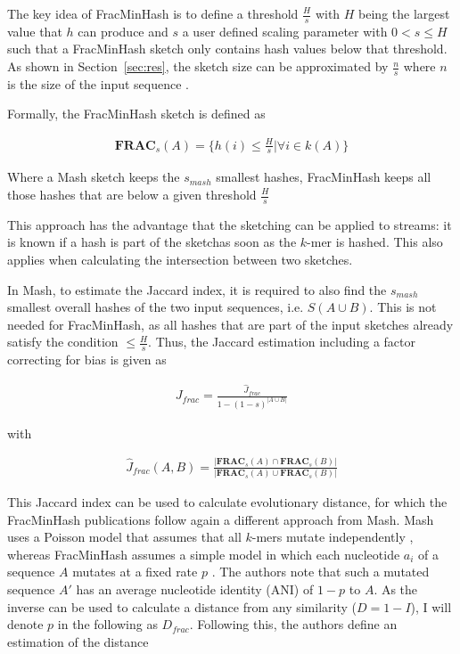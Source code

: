 The key idea of FracMinHash is to define a threshold $\frac{H}{s}$ with $H$
being the largest value that $h$ can produce and $s$ a user defined scaling
parameter with $0 < s \leq H$ such that a FracMinHash sketch only contains hash
values below that threshold. As shown in Section~\ref{sec:res}, the sketch size can be
approximated by $\frac{n}{s}$ where $n$ is the size of the input sequence
\cite{irberLightweightCompositionalAnalysis2022,heraDebiasingFracMinHashDeriving2023}.


Formally, the FracMinHash sketch is defined as 

\begin{align}
  \mathbf{FRAC}_s(A) = \{h(i) \leq \frac{H}{s} | \forall i \in k(A)\}
\end{align}

Where a Mash sketch keeps the $s_{mash}$ smallest hashes, FracMinHash keeps all
those hashes that are below a given threshold $\frac{H}{s}$

This approach has the advantage that the sketching can be applied to streams: it
is known if a hash is part of the sketchas soon as the $k$-mer is hashed. This
also applies when calculating the intersection between two sketches. 

In Mash, to estimate the Jaccard index, it is required to also find the
$s_{mash}$ smallest overall hashes of the two input sequences, i.e. $S(A \cup
B)$. This is not needed for FracMinHash, as all hashes that are part of the
input sketches already satisfy the condition $\leq \frac{H}{s}$. Thus, the
Jaccard estimation including a factor correcting for bias is given as

\begin{align}
  J_{frac} = \frac{\hat{J}_{frac}}{1 - (1 - s)^{|A \cup B|}}
\end{align}

with

\begin{align}
  \hat{J}_{frac}(A, B) = \frac{|\mathbf{FRAC}_s(A) \cap \mathbf{FRAC}_s(B)|}{|\mathbf{FRAC}_s(A) \cup \mathbf{FRAC}_s(B)|}  
\end{align}

This Jaccard index can be used to calculate evolutionary distance, for which the
FracMinHash publications follow again a different approach from Mash. Mash uses
a Poisson model that assumes that all $k$-mers mutate independently
\cite{ondovMashFastGenome2016,heraDebiasingFracMinHashDeriving2023,fanAssemblyAlignmentfreeMethod2015},
whereas FracMinHash assumes a simple model in which each nucleotide $a_i$ of a
sequence $A$ mutates at a fixed rate $p$
\cite{heraDebiasingFracMinHashDeriving2023}. The authors note that such a
mutated sequence $A'$ has an average nucleotide identity (ANI) of $1-p$ to $A$.
As the inverse can be used to calculate a distance from any similarity ($D = 1 -
I$), I will denote $p$ in the following as $D_{frac}$. Following this, the
authors define an estimation of the distance 

